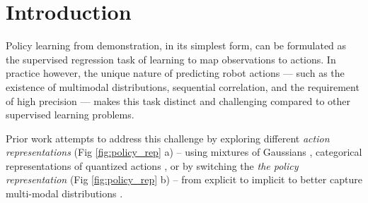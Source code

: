 \documentclass[Afour,sageh,times]{sagej}
\begin{document}







\section{Introduction}
Policy learning from demonstration, in its simplest form, can be formulated as the supervised regression task of learning to map observations to actions.
In practice however, the unique nature of predicting robot actions --- such as the existence of multimodal distributions, sequential correlation, and the requirement of high precision ---  makes this task distinct and challenging compared to other supervised learning problems.


Prior work attempts to address this challenge by exploring different \textit{action representations} (Fig \ref{fig:policy_rep} a) -- using mixtures of Gaussians \cite{robomimic}, categorical representations of quantized actions \cite{bet},
or by switching the \textit{the policy representation} (Fig \ref{fig:policy_rep} b) -- from  explicit to implicit to better capture multi-modal distributions \cite{ibc,wu2020spatial}.
\end{document}
